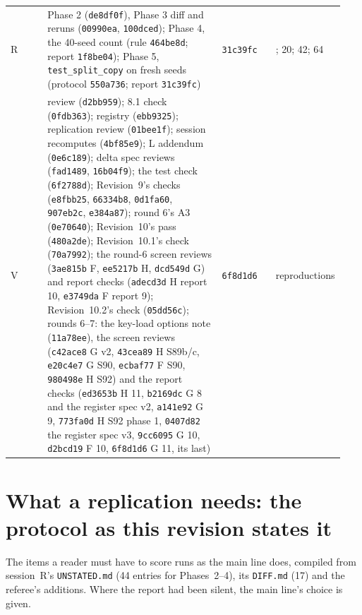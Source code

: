 \documentclass[11pt]{article}
\begin{document}
{\begin{longtable}{@{}>{\raggedright\arraybackslash}p{0.11\linewidth}>{\raggedright\arraybackslash}p{0.52\linewidth}>{\raggedright\arraybackslash}p{0.16\linewidth}>{\raggedright\arraybackslash}p{0.15\linewidth}@{}}
R & Phase 2 (\texttt{de8df0f}), Phase 3 diff and reruns (\texttt{00990ea}, \texttt{100dced}); Phase 4, the 40-seed count (rule \texttt{464be8d}; report \texttt{1f8be04}); Phase 5, \texttt{test\_split\_copy} on fresh seeds (protocol \texttt{550a736}; report \texttt{31c39fc}) & \texttt{31c39fc} & 42; 20; 42; 64\\
V & review (\texttt{d2bb959}); 8.1 check (\texttt{0fdb363}); registry (\texttt{ebb9325}); replication review (\texttt{01bee1f}); session recomputes (\texttt{4bf85e9}); L addendum (\texttt{0e6c189}); delta spec reviews (\texttt{fad1489}, \texttt{16b04f9}); the test check (\texttt{6f2788d}); Revision~9's checks (\texttt{e8fbb25}, \texttt{66334b8}, \texttt{0d1fa60}, \texttt{907eb2c}, \texttt{e384a87}); round 6's A3 (\texttt{0e70640}); Revision~10's pass (\texttt{480a2de}); Revision~10.1's check (\texttt{70a7992}); the round-6 screen reviews (\texttt{3ae815b} F, \texttt{ee5217b} H, \texttt{dcd549d} G) and report checks (\texttt{adecd3d} H report 10, \texttt{e3749da} F report 9); Revision~10.2's check (\texttt{05dd56c}); rounds 6--7: the key-load options note (\texttt{11a78ee}), the screen reviews (\texttt{c42ace8} G v2, \texttt{43cea89} H S89b/c, \texttt{e20c4e7} G S90, \texttt{ecbaf77} F S90, \texttt{980498e} H S92) and the report checks (\texttt{ed3653b} H 11, \texttt{b2169dc} G 8 and the register spec v2, \texttt{a141e92} G 9, \texttt{773fa0d} H S92 phase 1, \texttt{0407d82} the register spec v3, \texttt{9cc6095} G 10, \texttt{d2bcd19} F 10, \texttt{6f8d1d6} G 11, its last) & \texttt{6f8d1d6} & 2 reproductions\\
\bottomrule
\end{longtable}}

\section{What a replication needs: the protocol as this revision states it}
\label{app:repro}

The items a reader must have to score runs as the main line does, compiled from session~R's \texttt{UNSTATED.md} (44 entries for Phases~2--4), its \texttt{DIFF.md} (17) and the referee's additions. Where the report had been silent, the main line's choice is given.
\end{document}
